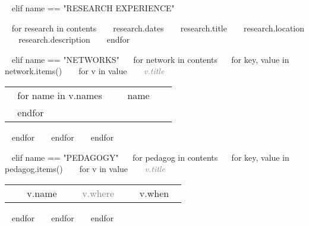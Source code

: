 \begin{minipage}{\textwidth}

~{ elif name == "RESEARCH EXPERIENCE" }~
\begin{entrylist}
~{ for research in contents }~
  \entry
    {~{{ research.dates }}~}
    {~{{ research.title }}~}
    {~{{ research.location }}~}
    {~{{ research.description }}~}
~{ endfor }~
\end{entrylist}

% 

~{ elif name == "NETWORKS" }~
~{for network in contents}~
  ~{ for key, value in network.items() }~
    ~{ for v in value }~
       \textcolor{gray}{{\emph{~{{ v.title }}~}}} 
       \begin{tabular}{ p{} %
                        p{} 
                        p{}} %
      ~{ for name in v.names }~ 
      \small &  ~{{ name }}~ & {\hfill}\\ 
      ~{ endfor }~
      \end{tabular}
    ~{ endfor }~
  ~{ endfor }~
~{ endfor }~ 



~{ elif name == "PEDAGOGY" }~
~{for pedagog in contents}~
  ~{ for key, value in pedagog.items() }~
    ~{ for v in value }~
        \textcolor{gray}{{\emph{~{{ v.title }}~}}} 
        \begin{tabular}{ p{} %
                        p{}
                        p{} 
                        p{}} %
        \small &  ~{{ v.name }}~ & {\hfill}\textcolor{gray}{\small{~{{ v.where }}~}} & {\hfill}\small{~{{ v.when }}~}\\ 
        \end{tabular}
      ~{ endfor }~
  ~{ endfor }~
~{ endfor }~ 


\end{minipage}
